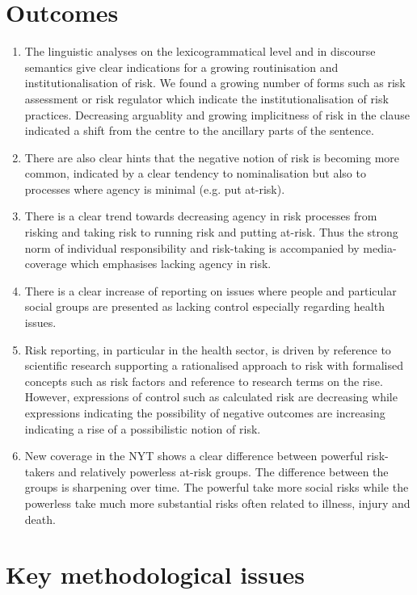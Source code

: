 \documentclass{report}
\begin{document}
\section*{Outcomes}

\begin{enumerate}
\item The linguistic analyses on the lexicogrammatical level and in discourse semantics give clear indications for a growing routinisation and institutionalisation of risk. We found a growing number of forms such as risk assessment or risk regulator which indicate the institutionalisation of risk practices. Decreasing arguablity and growing implicitness of risk in the clause indicated a shift from the centre to the ancillary parts of the sentence.
\item There are also clear hints that the negative notion of risk is becoming more common, indicated by a clear tendency to nominalisation but also to processes where agency is minimal (e.g. put at-risk).
\item There is a clear trend towards decreasing agency in risk processes from risking and taking risk to running risk and putting at-risk. Thus the strong norm of individual responsibility and risk-taking is accompanied by media-coverage which emphasises lacking agency in risk.
\item There is a clear increase of reporting on issues where people and particular social groups are presented as lacking control especially regarding health issues.
\item Risk reporting, in particular in the health sector, is driven by reference to scientific research supporting a rationalised approach to risk with formalised concepts such as risk factors and reference to research terms on the rise. However, expressions of control such as calculated risk are decreasing while expressions indicating the possibility of negative outcomes are increasing indicating a rise of a possibilistic notion of risk.
\item New coverage in the NYT shows a clear difference between powerful risk-takers and relatively powerless at-risk groups. The difference between the groups is sharpening over time. The powerful take more social risks while the powerless take much more substantial risks often related to illness, injury and death.
\end{enumerate}

\section*{Key methodological issues}
\end{document}
